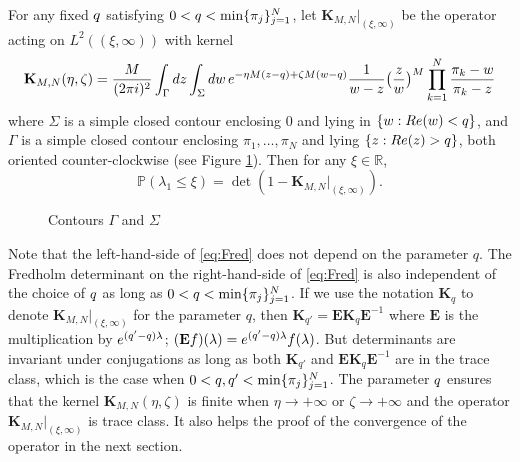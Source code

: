 \documentclass[11pt]{article}
\begin{document}
\begin{prop}\label{prop:integralformula}
For any fixed $q$ satisfying $0<q<\min\{\pi_j\}_{j=1}^N$,
let $\mathbf{K}_{M,N}|_{(\xi,\infty)}$ be the operator acting on
$L^2((\xi,\infty))$ with kernel
\begin{equation}\label{eq:Kkernel}
  \mathbf{K}_{M,N}(\eta, \zeta) =
  \frac{M}{(2\pi i)^2} \int_\Gamma dz \int_\Sigma dw
  \,
  e^{- \eta M(z-q) + \zeta M(w-q)}
  \frac1{w-z} \bigl(\frac{z}{w}\bigr)^M
  \prod_{k=1}^N
  \frac{\pi_k-w}{\pi_k-z}
\end{equation}
where $\Sigma$ is a simple closed contour enclosing $0$ and lying
in $\{w:Re(w)<q\}$, and $\Gamma$ is a simple closed contour
enclosing $\pi_1,\dots, \pi_N$ and lying $\{z:Re(z)>q\}$, both
oriented counter-clockwise (see Figure \ref{fig:Kcontour}). Then
for any $\xi\in\mathbb{R}$,
\begin{equation}\label{eq:Fred}
  \mathbb{P} (\lambda_1 \le \xi)
  = \det( 1-\mathbf{K}_{M,N}|_{(\xi,\infty)}).
\end{equation}
\end{prop}

\begin{figure}[ht]
\centerline{\epsfxsize=8cm}
\caption{Contours $\Gamma$ and $\Sigma$}\label{fig:Kcontour}
\end{figure}



\begin{remark}
Note that the left-hand-side of \eqref{eq:Fred} does not depend on
the parameter $q$. The Fredholm determinant on the right-hand-side
of \eqref{eq:Fred} is also independent of the choice of $q$ as
long as $0<q<\min\{\pi_j\}_{j=1}^N$. If we use the notation
$\mathbf{K}_q$ to denote $\mathbf{K}_{M,N}|_{(\xi,\infty)}$ for
the parameter $q$, then
$\mathbf{K}_{q'}=\mathbf{E}\mathbf{K}_q\mathbf{E}^{-1}$ where
$\mathbf{E}$ is the multiplication by $e^{(q'-q)\lambda}$;
$(\mathbf{E}f)(\lambda)= e^{(q'-q)\lambda} f(\lambda)$. But
determinants are invariant under conjugations as long as both
$\mathbf{K}_{q'}$ and $\mathbf{E}\mathbf{K}_q\mathbf{E}^{-1}$ are
in the trace class, which is the case when $0<q, q'
<\min\{\pi_j\}_{j=1}^N$. The parameter $q$ ensures that the
kernel $\mathbf{K}_{M,N}(\eta,\zeta)$ is finite when $\eta\to
+\infty$ or $\zeta \to +\infty$ and the operator
$\mathbf{K}_{M,N}|_{(\xi,\infty)}$ is trace class. It also helps
the proof of the convergence of the operator in the next section.
\end{remark}
\end{document}
